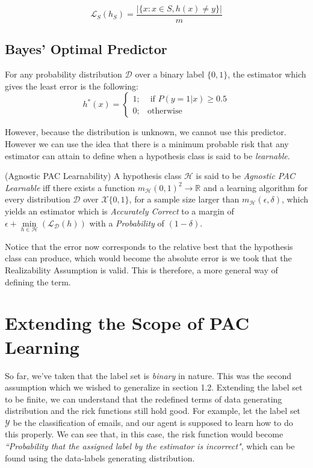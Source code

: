 \documentclass[11pt,oneside,onemany]{book} %
\begin{document}
$$\mathcal{L}_S(h_S) = \frac{|\{x: x\in S,h(x)\neq y\}|}{m}$$

\subsection{Bayes' Optimal Predictor}
For any probability distribution $\mathcal{D}$ over a binary label $\{0,1\}$, the estimator which gives the least error is the following:
$$
    h^*(x) = 
  \begin{cases}
    1; & \text{ if } P(y=1|x)\geq 0.5 \\
    0; & \text{otherwise}
  \end{cases}  
$$

However, because the distribution is unknown, we cannot use this predictor. However we can use the idea that there is a minimum probable risk that any estimator can attain to define when a hypothesis class is said to be \emph{learnable}.

\begin{definition}
\label{def:agn-PAC}
(Agnostic PAC Learnability) A hypothesis class $\mathcal{H}$ is said to be \emph{Agnostic PAC Learnable} iff there exists a function $m_\mathcal{H}(0,1)^2\rightarrow\mathbb{R}$ and a learning algorithm for every distribution $\mathcal{D}$ over $\mathcal{X}\{0,1\}$, for a sample size larger than $m_\mathcal{H}(\epsilon,\delta)$, which yields an estimator which is \emph{Accurately Correct} to a margin of $\epsilon + \min\limits_{h\in \mathcal{H}}(\mathcal{L}_\mathcal{D}(h))$ with a \emph{Probability} of $(1-\delta)$.
\end{definition}

Notice that the error now corresponds to the relative best that the hypothesis class can produce, which would become the absolute error is we took that the Realizability Assumption is valid. This is therefore, a more general way of defining the term.

\section{Extending the Scope of PAC Learning}

So far, we've taken that the label set is \emph{binary} in nature. This was the second assumption which we wished to generalize in section 1.2. Extending the label set to be finite, we can understand that the redefined terms of data generating distribution and the rick functions still hold good. For example, let the label set $\mathcal{Y}$ be the classification of emails, and our agent is supposed to learn how to do this properly. We can see that, in this case, the risk function would become \emph{``Probability that the assigned label by the estimator is incorrect"}, which can be found using the data-labels generating distribution.\\
\end{document}
